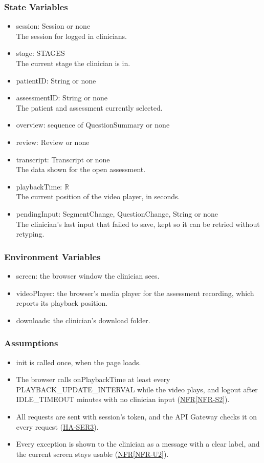 \documentclass[12pt, titlepage]{article}
\newcommand{\srsref}[2]{\href{https://github.com/Nour-Fawaz/MacaBoca/blob/main/pdfs/SRS/SRS.pdf}{#1\ref*{#2}}}
\newcommand{\hazref}[1]{\href{https://github.com/Nour-Fawaz/MacaBoca/blob/main/pdfs/HazardAnalysis/HazardAnalysis.pdf}{#1}}
\begin{document}
\subsubsection{State Variables}
\begin{itemize}
\item session: Session or none\\
The session for logged in clinicians.
\item stage: STAGES\\
The current stage the clinician is in.
\item patientID: String or none
\item assessmentID: String or none\\
The patient and assessment currently selected.
\item overview: sequence of QuestionSummary or none
\item review: Review or none
\item transcript: Transcript or none\\
The data shown for the open assessment.
\item playbackTime: $\mathbb{R}$\\
The current position of the video player, in seconds.
\item pendingInput: SegmentChange, QuestionChange, String or none\\
The clinician's last input that failed to save, kept so it can be retried without retyping.
\end{itemize}

\subsubsection{Environment Variables}
\begin{itemize}
\item screen: the browser window the clinician sees.
\item videoPlayer: the browser's media player for the assessment recording, which reports its playback position.
\item downloads: the clinician's download folder.
\end{itemize}

\subsubsection{Assumptions}
\begin{itemize}
\item init is called once, when the page loads.
\item The browser calls onPlaybackTime at least every PLAYBACK\_UPDATE\_INTERVAL while the video plays, and logout after IDLE\_TIMEOUT minutes with no clinician input (\srsref{NFR}{NFR-S2}).
\item All requests are sent with session's token, and the API Gateway checks it on every request (\hazref{HA-SER3}).
\item Every exception is shown to the clinician as a message with a clear label, and the current screen stays usable (\srsref{NFR}{NFR-U2}).
\end{itemize}
\end{document}

